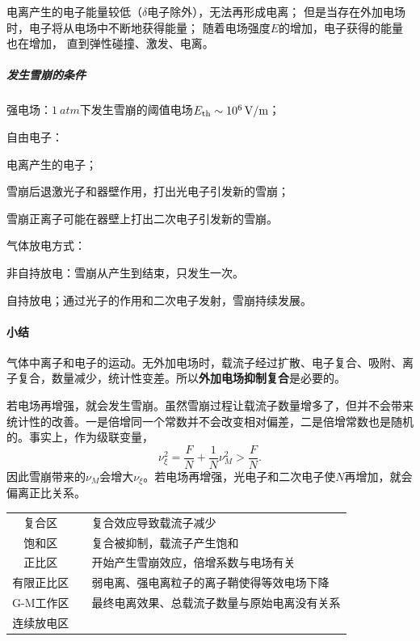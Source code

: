 电离产生的电子能量较低（$\delta$电子除外），无法再形成电离；
但是当存在外加电场时，电子将从电场中不断地获得能量；
随着电场强度$E$的增加，电子获得的能量也在增加，%
直到弹性碰撞、激发、电离。
\subparagraph{发生雪崩的条件}
\begin{compactenum}
	\item 强电场：$\SI{1}{atm}$下发生雪崩的阈值电场$E_{\mathrm{th}}\sim\SI{e6}{V/m}$；
	\item 自由电子：
	\begin{compactenum}
		\item 电离产生的电子；
		\item 雪崩后退激光子和器壁作用，打出光电子引发新的雪崩；
		\item 雪崩正离子可能在器壁上打出二次电子引发新的雪崩。
	\end{compactenum}
\end{compactenum}
气体放电方式：
\begin{compactitem}
	\item 非自持放电：雪崩从产生到结束，只发生一次。
	\item 自持放电；通过光子的作用和二次电子发射，雪崩持续发展。
\end{compactitem}
\paragraph{小结}气体中离子和电子的运动。无外加电场时，载流子经过扩散、电子复合、吸附、离子复合，数量减少，统计性变差。所以\textbf{外加电场抑制复合}是必要的。

若电场再增强，就会发生雪崩。虽然雪崩过程让载流子数量增多了，但并不会带来统计性的改善。一是倍增同一个常数并不会改变相对偏差，二是倍增常数也是随机的。事实上，作为级联变量，
\[
	\nu_\xi^2=\frac FN+\frac1N\nu_M^2>\frac FN.
\]
因此雪崩带来的$\nu_M$会增大$\nu_\xi$。若电场再增强，光电子和二次电子使$N$再增加，就会偏离正比关系。

\begin{center}
	\begin{tabular}{ccl}
		\toprule
		复合区&&复合效应导致载流子减少\\
		饱和区&\checkmark&复合被抑制，载流子产生饱和\\
		正比区&\checkmark&开始产生雪崩效应，倍增系数与电场有关\\
		有限正比区&&弱电离、强电离粒子的离子鞘使得等效电场下降\\
		G-M工作区&\checkmark&最终电离效果、总载流子数量与原始电离没有关系\\
		连续放电区\\
		\bottomrule
	\end{tabular}
\end{center}

